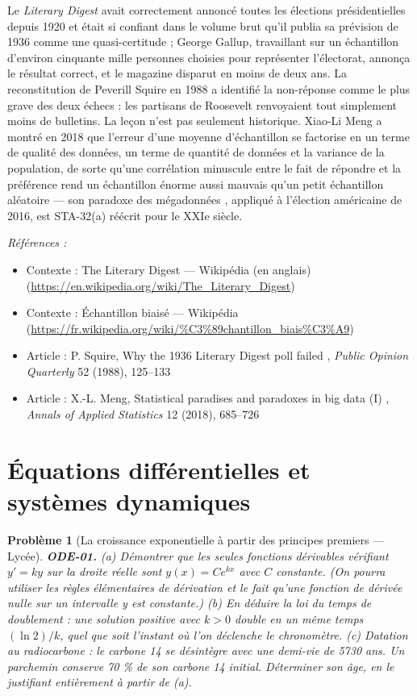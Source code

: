 \documentclass[11pt]{article}
\newtheorem{problem}{Problème}
\newenvironment{refs}{\par\small\noindent\emph{Références :}\begin{itemize}\setlength\itemsep{0pt}}{\end{itemize}\normalsize}
\begin{document}
\noindent Le \textit{Literary Digest} avait correctement annoncé toutes les élections
présidentielles depuis 1920 et était si confiant dans le volume brut qu'il publia sa prévision de
1936 comme une quasi-certitude ; George Gallup, travaillant sur un échantillon d'environ cinquante
mille personnes choisies pour représenter l'électorat, annonça le résultat correct, et le magazine
disparut en moins de deux ans. La reconstitution de Peverill Squire en 1988 a identifié la
non-réponse comme le plus grave des deux échecs : les partisans de Roosevelt renvoyaient tout
simplement moins de bulletins. La leçon n'est pas seulement historique. Xiao-Li Meng a montré en
2018 que l'erreur d'une moyenne d'échantillon se factorise en un terme de qualité des données, un
terme de quantité de données et la variance de la population, de sorte qu'une corrélation minuscule
entre le fait de répondre et la préférence rend un échantillon énorme aussi mauvais qu'un petit
échantillon aléatoire --- son \og{} paradoxe des mégadonnées \fg{}, appliqué à l'élection américaine de 2016,
est STA-32(a) réécrit pour le XXIe siècle.

\begin{refs}
\item Contexte : The Literary Digest --- Wikipédia (en anglais) (\url{https://en.wikipedia.org/wiki/The_Literary_Digest})
\item Contexte : Échantillon biaisé --- Wikipédia (\url{https://fr.wikipedia.org/wiki/%C3%89chantillon_biais%C3%A9})
\item Article : P. Squire, \og{} Why the 1936 Literary Digest poll failed \fg{}, \textit{Public Opinion Quarterly} 52 (1988), 125--133
\item Article : X.-L. Meng, \og{} Statistical paradises and paradoxes in big data (I) \fg{}, \textit{Annals of Applied Statistics} 12 (2018), 685--726
\end{refs}

\bigskip


\section*{Équations différentielles et systèmes dynamiques}

\begin{problem}[{La croissance exponentielle à partir des principes premiers --- Lycée}]
\textbf{ODE-01.} (a) Démontrer que les \textit{seules} fonctions dérivables
vérifiant $ y' = k y $ sur la droite réelle sont $ y(x) = C e^{kx} $ avec $ C $ constante.
(On pourra utiliser les règles élémentaires de dérivation et le fait qu'une fonction de dérivée
nulle sur un intervalle y est constante.)
(b) En déduire la loi du temps de doublement : une solution positive avec $ k >0 $ double en
un même temps $ (\ln 2)/k $, quel que soit l'instant où l'on déclenche le chronomètre.
(c) Datation au radiocarbone : le carbone 14 se désintègre avec une demi-vie de 5730 ans. Un
parchemin conserve 70 \% de son carbone 14 initial. Déterminer son âge, en le justifiant
entièrement à partir de (a).
\end{problem}
\end{document}
